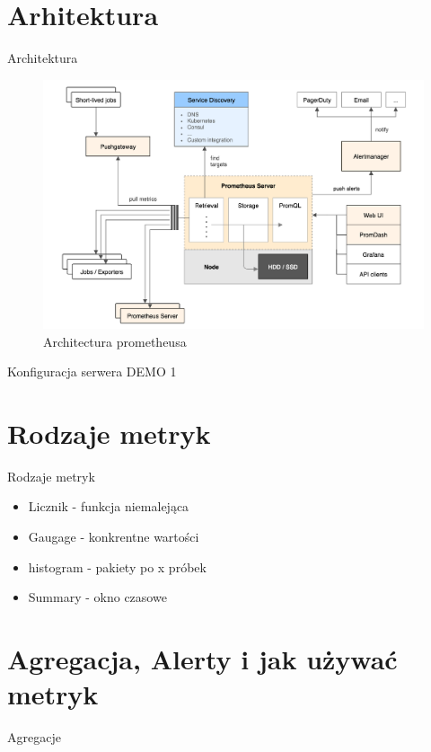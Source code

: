 \documentclass[epic,eepic,aspectratio=169,12pt]{beamer}
\begin{document}
\section{Arhitektura}
\begin{frame}{Architektura}
		\begin{figure}
			\centering
			\includegraphics[width=0.7\linewidth]{architecture}
			\caption{Architectura prometheusa}
			\label{fig:architecture}
		\end{figure}
\end{frame}
\begin{frame}{Konfiguracja serwera}
	DEMO 1
\end{frame}
\section{Rodzaje metryk}
\begin{frame}{Rodzaje metryk}
	\begin{itemize}
		\item Licznik - funkcja niemalejąca
		\item Gaugage - konkrentne wartości
		\item histogram - pakiety po x próbek
		\item Summary - okno czasowe
	\end{itemize}
\end{frame}
\section{Agregacja, Alerty i jak używać metryk}
\begin{frame}{Agregacje}
	
\end{frame}
\end{document}
